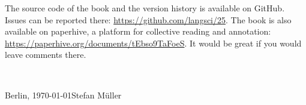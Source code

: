 The source code of the book and the version history is available on GitHub. Issues can be reported
there: \url{https://github.com/langsci/25}. The book is also available on paperhive, a platform for
collective reading and annotation: \url{https://paperhive.org/documents/tEbso9TaFoeS}. It would be
great if you would leave comments there. 





%




~\medskip

\noindent
Berlin, \today\hfill Stefan Müller



